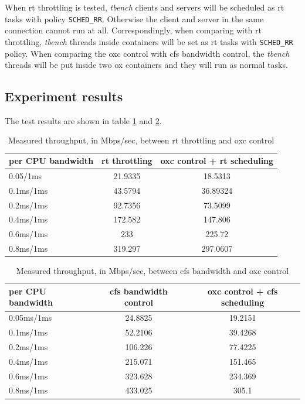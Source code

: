 When rt throttling is tested, \emph{tbench} clients and servers will be 
scheduled as rt tasks with policy \texttt{SCHED\_RR}. Otherwise the client 
and server in the same connection cannot run at all. Correspondingly, when 
comparing with rt throttling, \emph{tbench} threads inside containers will 
be set as rt tasks with \texttt{SCHED\_RR} policy. 
When comparing the oxc control with cfs bandwidth control, the \emph{tbench}
threads will be put inside two ox containers and they will run as normal
tasks. 

\subsection{Experiment results}
The test results are shown in table \ref{tab:expB1} and \ref{tab:expB2}.
\begin{table}[thbp]
	\centering
	\begin{tabular}{|l||c|c|}\hline
		 per CPU bandwidth & rt throttling & oxc control + rt scheduling\\\hline
			0.05/1ms &	21.9335	&	18.5313	\\\hline 
			0.1ms/1ms &	43.5794 &	36.89324 \\\hline
			0.2ms/1ms &	92.7356 &	73.5099	\\\hline
			0.4ms/1ms &	172.582 &	147.806 \\\hline
			0.6ms/1ms &	233	&	225.72	\\\hline
			0.8ms/1ms &	319.297 &	297.0607	\\\hline
	\end{tabular}
	\caption{Measured throughput, in Mbps/sec, between rt throttling and oxc control}
	\label{tab:expB1}
\end{table}
\begin{table}[thbp]
	\centering
	\begin{tabular}{|l||c|c|}\hline
		 per CPU bandwidth & cfs bandwidth control & oxc control + cfs scheduling  \\\hline
		 0.05ms/1ms	& 24.8825	& 19.2151 \\\hline
		 0.1ms/1ms	& 52.2106	& 39.4268 \\\hline
		 0.2ms/1ms	& 106.226	& 77.4225 \\\hline
		 0.4ms/1ms	& 215.071	& 151.465 \\\hline
		 0.6ms/1ms	& 323.628	& 234.369 \\\hline
		 0.8ms/1ms	& 433.025	& 305.1 \\\hline
	\end{tabular}
	\caption{Measured throughput, in Mbps/sec, between cfs bandwidth and oxc control}
	\label{tab:expB2}
\end{table}
